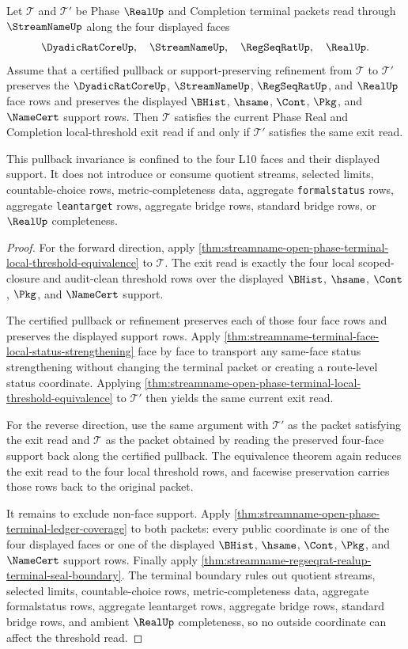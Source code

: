 \begin{theorem}
\label{thm:streamname-terminal-local-threshold-pullback}
Let $\mathcal T$ and $\mathcal T'$ be Phase $\RealUp$ and Completion terminal packets read through $\StreamNameUp$ along the four displayed faces
$$
\DyadicRatCoreUp,\quad \StreamNameUp,\quad \RegSeqRatUp,\quad \RealUp.
$$
Assume that a certified pullback or support-preserving refinement from $\mathcal T$ to $\mathcal T'$ preserves the $\DyadicRatCoreUp$, $\StreamNameUp$, $\RegSeqRatUp$, and $\RealUp$ face rows and preserves the displayed $\BHist$, $\hsame$, $\Cont$, $\Pkg$, and $\NameCert$ support rows. Then $\mathcal T$ satisfies the current Phase Real and Completion local-threshold exit read if and only if $\mathcal T'$ satisfies the same exit read.

This pullback invariance is confined to the four L10 faces and their displayed support. It does not introduce or consume quotient streams, selected limits, countable-choice rows, metric-completeness data, aggregate \texttt{formalstatus} rows, aggregate \texttt{leantarget} rows, aggregate bridge rows, standard bridge rows, or $\RealUp$ completeness.
\end{theorem}
\begin{proof}
For the forward direction, apply \autoref{thm:streamname-open-phase-terminal-local-threshold-equivalence} to $\mathcal T$. The exit read is exactly the four local scoped-closure and audit-clean threshold rows over the displayed $\BHist$, $\hsame$, $\Cont$, $\Pkg$, and $\NameCert$ support.

The certified pullback or refinement preserves each of those four face rows and preserves the displayed support rows. Apply \autoref{thm:streamname-terminal-face-local-status-strengthening} face by face to transport any same-face status strengthening without changing the terminal packet or creating a route-level status coordinate. Applying \autoref{thm:streamname-open-phase-terminal-local-threshold-equivalence} to $\mathcal T'$ then yields the same current exit read.

For the reverse direction, use the same argument with $\mathcal T'$ as the packet satisfying the exit read and $\mathcal T$ as the packet obtained by reading the preserved four-face support back along the certified pullback. The equivalence theorem again reduces the exit read to the four local threshold rows, and facewise preservation carries those rows back to the original packet.

It remains to exclude non-face support. Apply \autoref{thm:streamname-open-phase-terminal-ledger-coverage} to both packets: every public coordinate is one of the four displayed faces or one of the displayed $\BHist$, $\hsame$, $\Cont$, $\Pkg$, and $\NameCert$ support rows. Finally apply \autoref{thm:streamname-regseqrat-realup-terminal-seal-boundary}. The terminal boundary rules out quotient streams, selected limits, countable-choice rows, metric-completeness data, aggregate formalstatus rows, aggregate leantarget rows, aggregate bridge rows, standard bridge rows, and ambient $\RealUp$ completeness, so no outside coordinate can affect the threshold read.
\end{proof}
